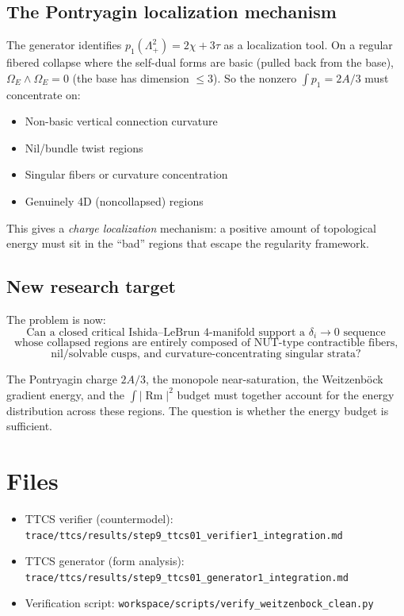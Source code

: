 \subsection{The Pontryagin localization mechanism}
The generator identifies $p_1(\Lambda^2_+) = 2\chi + 3\tau$ as a
localization tool. On a regular fibered collapse where the
self-dual forms are basic (pulled back from the base),
$\Omega_E \wedge \Omega_E = 0$ (the base has dimension $\le 3$).
So the nonzero $\int p_1 = 2A/3$ must concentrate on:
\begin{itemize}
\item Non-basic vertical connection curvature
\item Nil/bundle twist regions
\item Singular fibers or curvature concentration
\item Genuinely 4D (noncollapsed) regions
\end{itemize}
This gives a \emph{charge localization} mechanism:
a positive amount of topological energy must sit
in the ``bad'' regions that escape the regularity framework.

\subsection{New research target}
The problem is now:
\[
\boxed{
\text{Can a closed critical Ishida--LeBrun 4-manifold support a }
\delta_i\to0\text{ sequence}
}
\]
\[
\boxed{
\text{whose collapsed regions are entirely composed of
NUT-type contractible fibers,}
}
\]
\[
\boxed{
\text{nil/solvable cusps, and curvature-concentrating
singular strata?}
}
\]

The Pontryagin charge $2A/3$, the monopole near-saturation,
the Weitzenb\"ock gradient energy, and the $\int|\operatorname{Rm}|^2$
budget must together account for the energy distribution
across these regions. The question is whether the energy
budget is sufficient.

\section{Files}
\begin{itemize}
\item TTCS verifier (countermodel): \texttt{trace/ttcs/results/step9\_ttcs01\_verifier1\_integration.md}
\item TTCS generator (form analysis): \texttt{trace/ttcs/results/step9\_ttcs01\_generator1\_integration.md}
\item Verification script: \texttt{workspace/scripts/verify\_weitzenbock\_clean.py}
\end{itemize}

